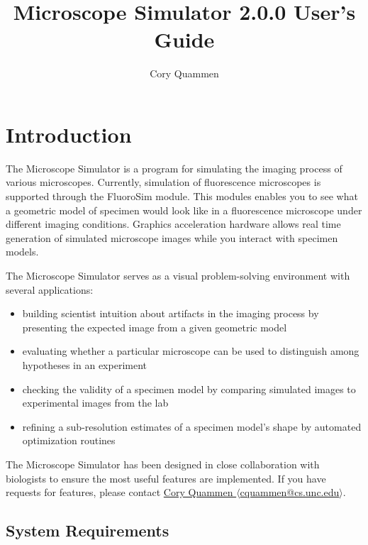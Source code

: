 \documentclass[11pt,titlepage]{article}
\title{Microscope Simulator 2.0.0 User's Guide}
\author{Cory Quammen}
\begin{document}
\maketitle
\tableofcontents

\pagebreak

\section{Introduction}

The Microscope Simulator is a program for simulating the imaging process of various microscopes. Currently, simulation of fluorescence microscopes is supported through the FluoroSim module. This modules enables you to see what a geometric model of specimen would look like in a fluorescence microscope under different imaging conditions. Graphics acceleration hardware allows real time generation of simulated microscope images while you interact with specimen models.

The Microscope Simulator serves as a visual problem-solving environment with several applications:

\begin{itemize}

\item building scientist intuition about artifacts in the imaging process by presenting the expected image from a given geometric model

\item evaluating whether a particular microscope can be used to distinguish among hypotheses in an experiment

\item checking the validity of a specimen model by comparing simulated images to experimental images from the lab

\item refining a sub-resolution estimates of a specimen model's shape by automated optimization routines

\end{itemize}

The Microscope Simulator has been designed in close collaboration with biologists to ensure the most useful features are implemented. If you have requests for features, please contact  \href{mailto:cquammen@cs.unc.edu}{Cory Quammen $\langle$cquammen@cs.unc.edu$\rangle$}.


\subsection{System Requirements}
\end{document}
